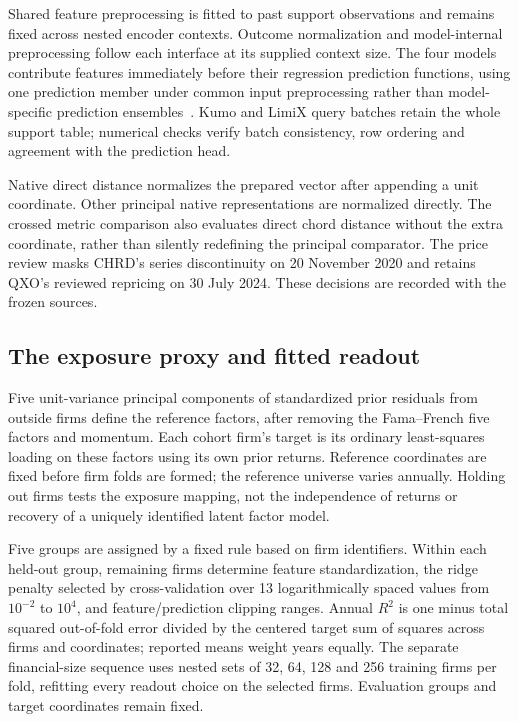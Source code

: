 \documentclass[11pt]{article}
\begin{document}
Shared feature preprocessing is fitted to past support observations and remains
fixed across nested encoder contexts. Outcome normalization and model-internal
preprocessing follow each interface at its supplied context size. The four
models contribute features immediately before their regression prediction
functions, using one prediction member under common input preprocessing rather
than model-specific prediction ensembles~\cite{tabpfn,tabfm,kumo,limix}.
Kumo and LimiX query batches retain the whole support table; numerical checks
verify batch consistency, row ordering and agreement with the prediction head.

Native direct distance normalizes the prepared vector after appending a unit
coordinate. Other principal native representations are normalized directly.
The crossed metric comparison also evaluates direct chord distance without the
extra coordinate, rather than silently redefining the principal comparator.
The price review masks CHRD's series discontinuity on 20 November 2020 and
retains QXO's reviewed repricing on 30 July 2024. These decisions are recorded
with the frozen sources.

\subsection{The exposure proxy and fitted readout}
Five unit-variance principal components of standardized prior residuals from
outside firms define the reference factors, after removing the
Fama--French %
five factors and momentum. Each cohort firm's target is its ordinary
least-squares loading on these factors using its own prior returns. Reference
coordinates are fixed before firm folds are formed; the reference universe
varies annually. Holding out firms tests the exposure mapping, not the
independence of returns or recovery of a uniquely identified latent
factor model.

Five groups are assigned by a fixed rule based on firm identifiers. Within each
held-out group, remaining firms determine feature standardization, the ridge
penalty selected by cross-validation over 13 logarithmically spaced values from
$10^{-2}$ to $10^4$, and feature/prediction clipping ranges. Annual $R^2$ is one
minus total squared out-of-fold error divided by the centered target sum of
squares across firms and coordinates; reported means weight years equally.
The separate financial-size sequence uses nested sets of 32, 64, 128 and 256
training firms per fold, refitting every readout choice on the selected firms.
Evaluation groups and target coordinates remain fixed.
\end{document}
